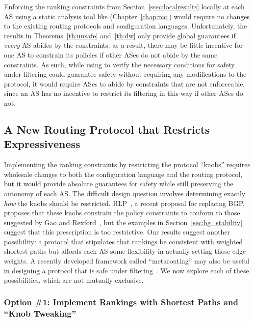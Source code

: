 Enforcing the ranking constraints from Section~\ref{ssec:localresults}
locally at each AS using a static analysis tool like \rcc
(Chapter~\ref{chap:rcc}) would require no changes to the existing
routing protocols and configuration languages.  Unfortunately, the
results in Theorems~\ref{th:unsafe} and~\ref{th:dw} only provide global
guarantees if {\em every} AS abides by the constraints: as a result,
there may be little incentive for one AS to constrain its policies if
other ASes do not abide by the same constraints.  As such, while using \rcc
to verify the necessary conditions for safety under filtering could
guarantee safety without requiring any modifications to the protocol, it
would require ASes to abide by constraints that are not enforceable,
since an AS has no incentive to restrict its filtering in this way if
other ASes do not.

\subsection{A New Routing Protocol that Restricts Expressiveness}

Implementing the ranking constraints by restricting the protocol
``knobs'' requires wholesale changes to both the configuration language
and the routing protocol, but it would provide absolute guarantees for
safety while still preserving the autonomy of each AS.  The difficult
design question involves determining exactly {\em how} the knobs should be
restricted.  HLP~\cite{Subramanian2005}, a recent proposal for replacing
BGP, proposes that these knobs constrain the
policy constraints to conform to those suggested by Gao and
Rexford~\cite{Gao2001a}, but the examples in
Section~\ref{sec:bg_stability} suggest that this prescription is too
restrictive.  Our results suggest another possibility: a
protocol that stipulates that rankings be consistent with weighted
shortest paths but affords each AS some flexibility in actually setting
those edge weights.  A recently developed framework called
``metarouting'' may also be useful in designing a protocol that is safe
under filtering~\cite{Griffin2005}.  We now explore each of these
possibilities, which are not mutually exclusive.

\subsubsection{Option \#1: Implement Rankings with Shortest Paths and
  ``Knob Tweaking''}

